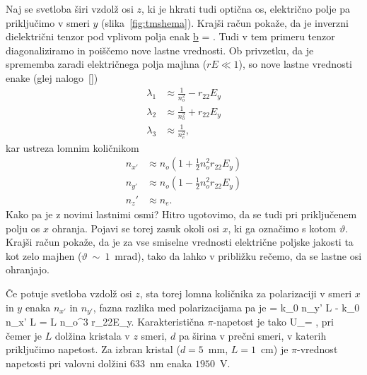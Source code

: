 Naj se svetloba širi vzdolž osi $z$, ki je hkrati tudi optična os, 
električno polje pa priključimo v smeri $y$ (slika~\ref{fig:tmshema}). 
Krajši račun pokaže, da je inverzni dielektrični tenzor pod vplivom polja enak
\beq
\underline{b} = 
 .
\label{7.8b}
\eeq
Tudi v tem primeru tenzor diagonaliziramo in poiščemo nove lastne vrednosti.
Ob privzetku, da je sprememba zaradi električnega polja majhna ($rE\ll1$),
so nove lastne vrednosti enake (glej nalogo~\ref{})
\begin{align}
\lambda_1 &\approx \frac{1}{n_o^2}-r_{22}E_y \\
\lambda_2 &\approx \frac{1}{n_o^2}+ r_{22}E_y \\
\lambda_3 &\approx \frac{1}{n_e^2},
\end{align}
kar ustreza lomnim količnikom 
\begin{align}
n_{x'} &\approx n_o(1+\frac{1}{2}n_o^2r_{22}E_y)\\
n_{y'} &\approx n_o(1-\frac{1}{2}n_o^2r_{22}E_y)\\
n_z' &\approx n_e.
\end{align}
Kako pa je z novimi lastnimi osmi? Hitro ugotovimo, da se tudi pri 
priključenem polju os $x$ ohranja. Pojavi se torej zasuk okoli osi $x$,
ki ga označimo s kotom $\vartheta$. Krajši račun pokaže, da je za vse smiselne
vrednosti električne poljske jakosti ta kot zelo majhen ($\vartheta~\sim~1$~mrad),
tako da lahko v približku rečemo, da se lastne osi ohranjajo. 

Če potuje svetloba vzdolž osi $z$, sta torej lomna količnika za 
polarizaciji v smeri $x$ in $y$ enaka $n_{x'}$ in $n_{y'}$, fazna razlika med 
polarizacijama pa je 
\beq
\Delta \phi = k_0 n_{y'} L - k_0 n_{x'} L = L 
n_o^3 r_{22}E_y.
\eeq
Karakteristična $\pi$-napetost je tako
\beq
U_\pi = ,
\eeq
pri čemer je $L$ dolžina kristala v $z$ smeri, $d$ pa širina v prečni smeri, v
katerih priključimo napetost. Za izbran kristal ($d=5$~mm, $L=1$~cm) je $\pi$-vrednost 
napetosti pri valovni dolžini $633$~nm enaka $1950$~V. 

